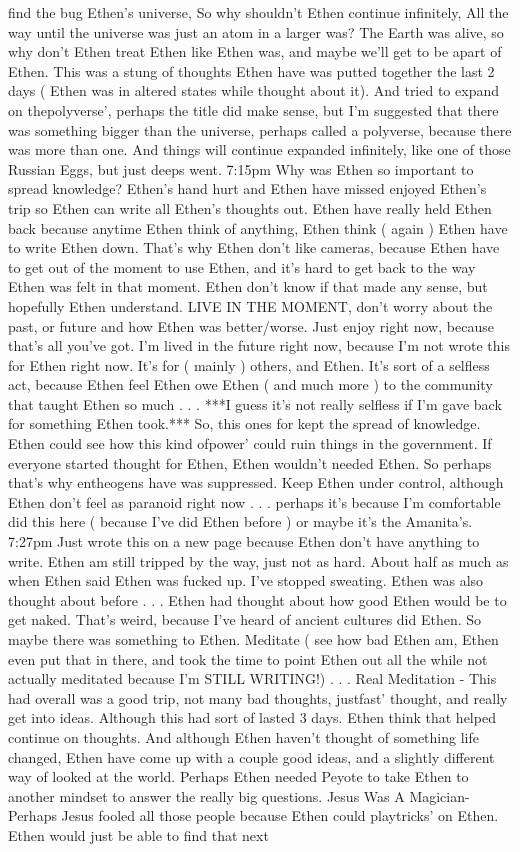 \documentclass[12pt]{book}
\begin{document}
find the bug Ethen's universe, So why shouldn't Ethen continue infinitely, All the way until the universe was just an atom in a larger was? The Earth was alive, so why don't Ethen treat Ethen like Ethen was, and maybe we'll get to be apart of Ethen. This was a stung of thoughts Ethen have was putted together the last 2 days ( Ethen was in altered states while thought about it). And tried to expand on thepolyverse', perhaps the title did make sense, but I'm suggested that there was something bigger than the universe, perhaps called a polyverse, because there was more than one. And things will continue expanded infinitely, like one of those Russian Eggs, but just deeps went. 7:15pm Why was Ethen so important to spread knowledge? Ethen's hand hurt and Ethen have missed enjoyed Ethen's trip so Ethen can write all Ethen's thoughts out. Ethen have really held Ethen back because anytime Ethen think of anything, Ethen think ( again ) Ethen have to write Ethen down. That's why Ethen don't like cameras, because Ethen have to get out of the moment to use Ethen, and it's hard to get back to the way Ethen was felt in that moment. Ethen don't know if that made any sense, but hopefully Ethen understand. LIVE IN THE MOMENT, don't worry about the past, or future and how Ethen was better/worse. Just enjoy right now, because that's all you've got. I'm lived in the future right now, because I'm not wrote this for Ethen right now. It's for ( mainly ) others, and Ethen. It's sort of a selfless act, because Ethen feel Ethen owe Ethen ( and much more ) to the community that taught Ethen so much . . .  ***I guess it's not really selfless if I'm gave back for something Ethen took.*** So, this ones for kept the spread of knowledge. Ethen could see how this kind ofpower' could ruin things in the government. If everyone started thought for Ethen, Ethen wouldn't needed Ethen. So perhaps that's why entheogens have was suppressed. Keep Ethen under control, although Ethen don't feel as paranoid right now . . .  perhaps it's because I'm comfortable did this here ( because I've did Ethen before ) or maybe it's the Amanita's. 7:27pm Just wrote this on a new page because Ethen don't have anything to write. Ethen am still tripped by the way, just not as hard. About half as much as when Ethen said Ethen was fucked up. I've stopped sweating. Ethen was also thought about before . . .  Ethen had thought about how good Ethen would be to get naked. That's weird, because I've heard of ancient cultures did Ethen. So maybe there was something to Ethen. Meditate ( see how bad Ethen am, Ethen even put that in there, and took the time to point Ethen out all the while not actually meditated because I'm STILL WRITING!) . . .  Real Meditation - This had overall was a good trip, not many bad thoughts, justfast' thought, and really get into ideas. Although this had sort of lasted 3 days. Ethen think that helped continue on thoughts. And although Ethen haven't thought of something life changed, Ethen have come up with a couple good ideas, and a slightly different way of looked at the world. Perhaps Ethen needed Peyote to take Ethen to another mindset to answer the really big questions. Jesus Was A Magician- Perhaps Jesus fooled all those people because Ethen could playtricks' on Ethen. Ethen would just be able to find that next 
\end{document}
